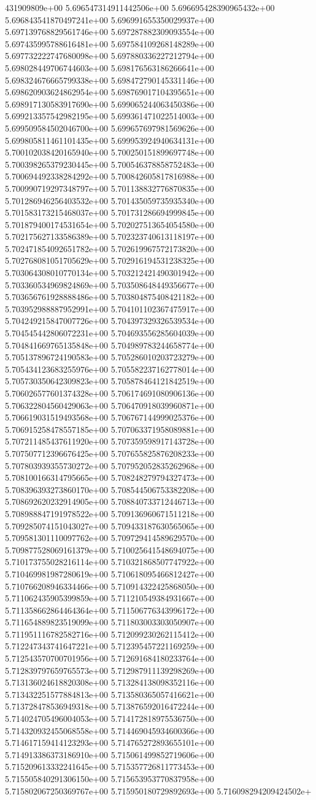 431909809e+00	5.696547314911442506e+00	5.696695428390965432e+00	5.696843541870497241e+00	5.696991655350029937e+00	5.697139768829561746e+00	5.697287882309093554e+00	5.697435995788616481e+00	5.697584109268148289e+00	5.697732222747680098e+00	5.697880336227212794e+00	5.698028449706744603e+00	5.698176563186266641e+00	5.698324676665799338e+00	5.698472790145331146e+00	5.698620903624862954e+00	5.698769017104395651e+00	5.698917130583917690e+00	5.699065244063450386e+00	5.699213357542982195e+00	5.699361471022514003e+00	5.699509584502046700e+00	5.699657697981569626e+00	5.699805811461101435e+00	5.699953924940634131e+00	5.700102038420165940e+00	5.700250151899697748e+00	5.700398265379230445e+00	5.700546378858752483e+00	5.700694492338284292e+00	5.700842605817816988e+00	5.700990719297348797e+00	5.701138832776870835e+00	5.701286946256403532e+00	5.701435059735935340e+00	5.701583173215468037e+00	5.701731286694999845e+00	5.701879400174531654e+00	5.702027513654054580e+00	5.702175627133586389e+00	5.702323740613118197e+00	5.702471854092651782e+00	5.702619967572173820e+00	5.702768081051705629e+00	5.702916194531238325e+00	5.703064308010770134e+00	5.703212421490301942e+00	5.703360534969824869e+00	5.703508648449356677e+00	5.703656761928888486e+00	5.703804875408421182e+00	5.703952988887952991e+00	5.704101102367475917e+00	5.704249215847007726e+00	5.704397329326539534e+00	5.704545442806072231e+00	5.704693556285604039e+00	5.704841669765135848e+00	5.704989783244658774e+00	5.705137896724190583e+00	5.705286010203723279e+00	5.705434123683255976e+00	5.705582237162778014e+00	5.705730350642309823e+00	5.705878464121842519e+00	5.706026577601374328e+00	5.706174691080906136e+00	5.706322804560429063e+00	5.706470918039960871e+00	5.706619031519493568e+00	5.706767144999025376e+00	5.706915258478557185e+00	5.707063371958089881e+00	5.707211485437611920e+00	5.707359598917143728e+00	5.707507712396676425e+00	5.707655825876208233e+00	5.707803939355730272e+00	5.707952052835262968e+00	5.708100166314795665e+00	5.708248279794327473e+00	5.708396393273860170e+00	5.708544506753382208e+00	5.708692620232914905e+00	5.708840733712446713e+00	5.708988847191978522e+00	5.709136960671511218e+00	5.709285074151043027e+00	5.709433187630565065e+00	5.709581301110097762e+00	5.709729414589629570e+00	5.709877528069161379e+00	5.710025641548694075e+00	5.710173755028216114e+00	5.710321868507747922e+00	5.710469981987280619e+00	5.710618095466812427e+00	5.710766208946334466e+00	5.710914322425868050e+00	5.711062435905399859e+00	5.711210549384931667e+00	5.711358662864464364e+00	5.711506776343996172e+00	5.711654889823519099e+00	5.711803003303050907e+00	5.711951116782582716e+00	5.712099230262115412e+00	5.712247343741647221e+00	5.712395457221169259e+00	5.712543570700701956e+00	5.712691684180233764e+00	5.712839797659765573e+00	5.712987911139298269e+00	5.713136024618820308e+00	5.713284138098352116e+00	5.713432251577884813e+00	5.713580365057416621e+00	5.713728478536949318e+00	5.713876592016472244e+00	5.714024705496004053e+00	5.714172818975536750e+00	5.714320932455068558e+00	5.714469045934600366e+00	5.714617159414123293e+00	5.714765272893655101e+00	5.714913386373186910e+00	5.715061499852719606e+00	5.715209613332241645e+00	5.715357726811773453e+00	5.715505840291306150e+00	5.715653953770837958e+00	5.715802067250369767e+00	5.715950180729892693e+00	5.716098294209424502e+